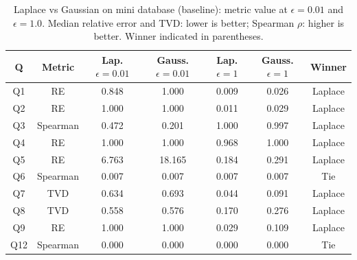 \documentclass[12pt,letterpaper]{article}
\begin{document}
\begin{table}[H]
\centering
\caption{Laplace vs Gaussian on mini database (baseline): metric value at $\epsilon = 0.01$ and $\epsilon = 1.0$. Median relative error and TVD: lower is better; Spearman $\rho$: higher is better. Winner indicated in parentheses.}
\label{tab:lap_vs_gauss}
\small
\begin{tabular}{@{}ccccccc@{}}
\toprule
\textbf{Q} & \textbf{Metric} & \textbf{Lap.} $\epsilon{=}0.01$ & \textbf{Gauss.} $\epsilon{=}0.01$ & \textbf{Lap.} $\epsilon{=}1$ & \textbf{Gauss.} $\epsilon{=}1$ & \textbf{Winner} \\
\midrule
Q1  & RE       & 0.848 & 1.000  & 0.009 & 0.026 & Laplace \\
Q2  & RE       & 1.000 & 1.000  & 0.011 & 0.029 & Laplace \\
Q3  & Spearman & 0.472 & 0.201  & 1.000 & 0.997 & Laplace \\
Q4  & RE       & 1.000 & 1.000  & 0.968 & 1.000 & Laplace \\
Q5  & RE       & 6.763 & 18.165 & 0.184 & 0.291 & Laplace \\
Q6  & Spearman & 0.007 & 0.007  & 0.007 & 0.007 & Tie \\
Q7  & TVD      & 0.634 & 0.693  & 0.044 & 0.091 & Laplace \\
Q8  & TVD      & 0.558 & 0.576  & 0.170 & 0.276 & Laplace \\
Q9  & RE       & 1.000 & 1.000  & 0.029 & 0.109 & Laplace \\
Q12 & Spearman & 0.000 & 0.000  & 0.000 & 0.000 & Tie \\
\bottomrule
\end{tabular}
\end{table}
\end{document}
